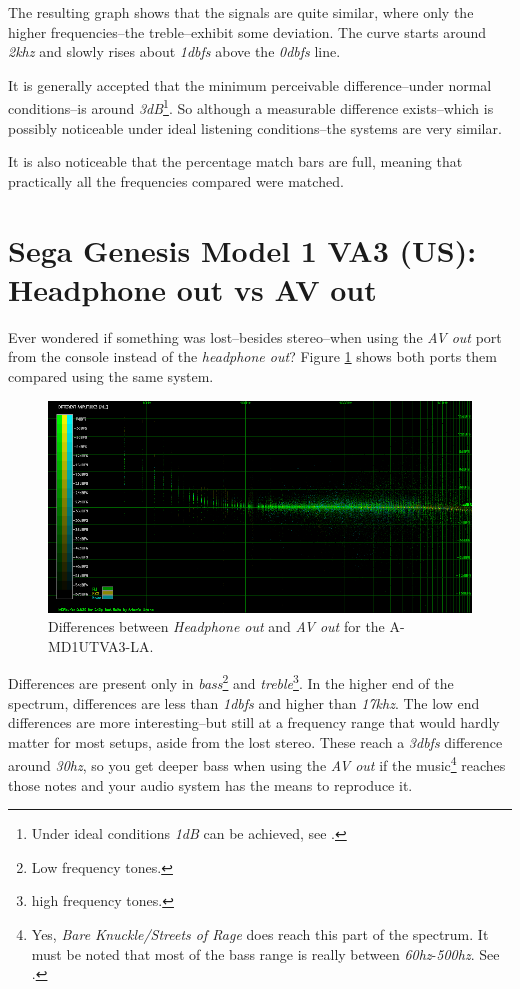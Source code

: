 \documentclass[10pt,a4paper]{report}
\newcommand{\hz}[1]{\textit{#1\acrshort{hz}}}
\newcommand{\khz}[1]{\textit{#1\acrshort{khz}}}
\newcommand{\db}[1]{\textit{#1\acrshort{dbfs}}}
\begin{document}
The resulting graph shows that the signals are quite similar, where only the higher frequencies--the treble--exhibit some deviation. The curve starts around \khz{2} and slowly rises about \db{1} above the \db{0} line.

It is generally accepted that the minimum perceivable difference--under normal conditions--is around \textit{3dB}\footnote{Under ideal conditions \textit{1dB} can be achieved, see \cite{dbdiff}.}. So although a measurable difference exists--which is possibly noticeable under ideal listening conditions--the systems are very similar.

It is also noticeable that the percentage match bars are full, meaning that practically all the frequencies compared were matched.

\section{Sega Genesis Model 1 VA3 (US):\\ Headphone out vs AV out}

Ever wondered if something was lost--besides stereo--when using the \textit{AV out} port from the console instead of the \textit{headphone out}? Figure \ref{fig:A-MD1UTVA3-LA_vs_A-MD1UTVA3-AV-LA} shows both ports them compared using the same system.

\begin{figure}[H]
	\centering
	\includegraphics[width=1.0\linewidth]{images/results/1-A-MD1UTVA3-LA_vs_A-MD1UTVA3-AV-LA.png}
	\caption[A-MD1UTVA3-LA AV Out]{Differences between \textit{Headphone out} and \textit{AV out} for the A-MD1UTVA3-LA.}
	\label{fig:A-MD1UTVA3-LA_vs_A-MD1UTVA3-AV-LA}
\end{figure}

Differences are present only in \textit{bass}\footnote{Low frequency tones.} and \textit{treble}\footnote{high frequency tones.}. In the higher end of the spectrum, differences are less than \db{1} and higher than \khz{17}. The low end differences are more interesting--but still at a frequency range that would hardly matter for most setups, aside from the lost stereo. These reach a \db{3} difference around \hz{30}, so you get deeper bass when using the \textit{AV out} if the music\footnote{Yes, \textit{Bare Knuckle/Streets of Rage} does reach this part of the spectrum. It must be noted that most of the bass range is really between \hz{60}-\hz{500}. See \cite{bass}.} reaches those notes and your audio system has the means to reproduce it.
\end{document}
